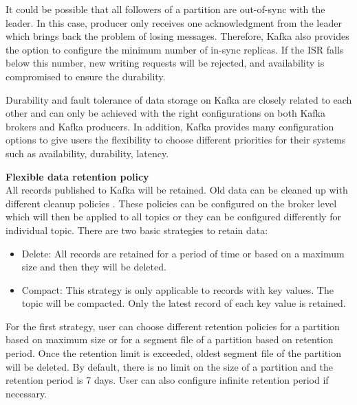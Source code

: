 It could be possible that all followers of a partition are out-of-sync with the leader. In this case, producer only receives one acknowledgment from the leader which brings back the problem of losing messages. Therefore, Kafka also provides the option to configure the minimum number of in-sync replicas. If the ISR falls below this number, new writing requests will be rejected, and availability is compromised to ensure the durability.

Durability and fault tolerance of data storage on Kafka are closely related to each other and can only be achieved with the right configurations on both Kafka brokers and Kafka producers. In addition, Kafka provides many configuration options to give users the flexibility to choose different priorities for their systems such as availability, durability, latency. 

\textbf{Flexible data retention policy}\\
All records published to Kafka will be retained. Old data can be cleaned up with different cleanup policies \cite{kafkacleanuppolicy}. These policies can be configured on the broker level which will then be applied to all topics or they can be configured differently for individual topic. There are two basic strategies to retain data:
\begin{itemize}
	\item Delete: All records are retained for a period of time or based on a maximum size and then they will be deleted.
	\item Compact: This strategy is only applicable to records with key values. The topic will be compacted. Only the latest record of each key value is retained.
\end{itemize}

For the first strategy, user can choose different retention policies for a partition based on maximum size or for a segment file of a partition based on retention period. Once the retention limit is exceeded, oldest segment file of the partition will be deleted. By default, there is no limit on the size of a partition and the retention period is 7 days. User can also configure infinite retention period if necessary.

